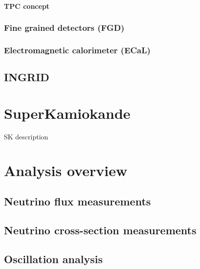 \documentclass[../main.tex]{subfiles}
\begin{document}
\subsubsection{TPC concept}
\subsection{Fine grained detectors (FGD)}
\subsection{Electromagnetic calorimeter (ECaL)}
\section {INGRID}
\chapter{SuperKamiokande}
SK description

\chapter{Analysis overview}
\section{Neutrino flux measurements}
\section{Neutrino cross-section measurements}
\section{Oscillation analysis}
\end{document}
